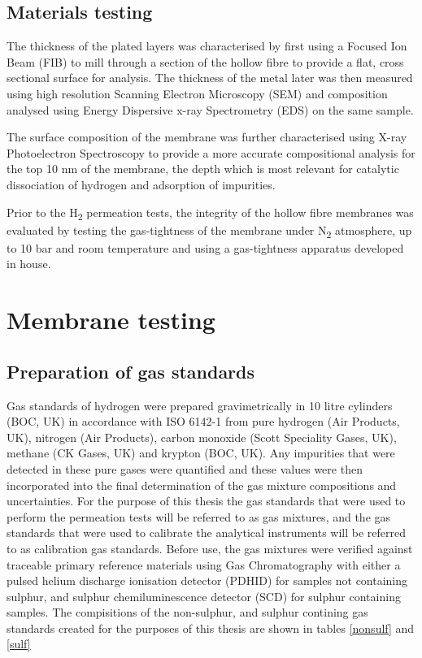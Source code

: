 \subsection{Materials testing}\label{MatTest}
The thickness of the plated layers was characterised by first using a Focused Ion Beam (FIB) to mill through a section of the hollow fibre to provide a flat, cross sectional surface for analysis. The thickness of the metal later was then measured using high resolution Scanning Electron Microscopy (SEM) and composition analysed using Energy Dispersive x-ray Spectrometry (EDS) on the same sample. 

The surface composition of the membrane was further characterised using X-ray Photoelectron Spectroscopy to provide a more accurate compositional analysis for the top 10 nm of the membrane, the depth which is most relevant for catalytic dissociation of hydrogen and adsorption of impurities.

Prior to the H\textsubscript{2} permeation tests, the integrity of the hollow fibre membranes was evaluated by testing the gas-tightness of the membrane under N\textsubscript{2} atmosphere, up to 10 bar and room temperature and using a gas-tightness apparatus developed in house. \cite{GouveiaGil2015}

\section{Membrane testing}
\subsection{Preparation of gas standards} \label{gasprep}
Gas standards of hydrogen were prepared gravimetrically in 10 litre cylinders (BOC, UK) in accordance with ISO 6142-1 from pure hydrogen (Air Products, UK), nitrogen (Air Products), carbon monoxide (Scott Speciality Gases, UK), methane (CK Gases, UK) and krypton (BOC, UK). Any impurities that were detected in these pure gases were quantified and these values were then incorporated into the final determination of the gas mixture compositions and uncertainties. For the purpose of this thesis the gas standards that were used to perform the permeation tests will be referred to as gas mixtures, and the gas standards that were used to calibrate the analytical instruments will be referred to as calibration gas standards. Before use, the gas mixtures were verified against traceable primary reference materials using Gas Chromatography with either a pulsed helium discharge ionisation detector (PDHID) for samples not containing sulphur, and sulphur chemiluminescence detector (SCD) for sulphur containing samples. The compisitions of the non-sulphur, and sulphur contining gas standards created for the purposes of this thesis are shown in tables \ref{nonsulf} and \ref{sulf}

